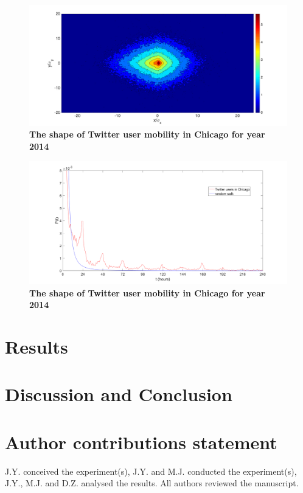 \documentclass[fleqn,10pt]{wlscirep}
\begin{document}
\begin{figure}[ht]
	\includegraphics[width=1.0\linewidth]{./figure/Chicago_Shape}
	\caption{{\bf The shape of Twitter user mobility in Chicago for year 2014}}
	\label{Fig_shape}
\end{figure}

\begin{figure}[ht]
	\includegraphics[width=1.0\linewidth]{./figure/firsttime}
	\caption{{\bf The shape of Twitter user mobility in Chicago for year 2014}}
	\label{first_time_passage}
\end{figure}




\section*{Results}

\section*{Discussion and Conclusion}



\section*{Author contributions statement}
J.Y. conceived the experiment(s),  J.Y. and M.J. conducted the experiment(s), J.Y., M.J. and D.Z. analysed the results.  All authors reviewed the manuscript. 


\end{document}

